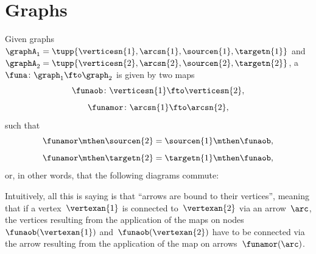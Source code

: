 

\section[Graphs]{Graphs}
\label{sec:cat-grph}


\begin{ctdefinition}
    \label{def:graph-homomorphism}
    Given graphs~${\graphA}_1=\tupp{\verticesn{1},\arcsn{1},\sourcen{1},\targetn{1}}$ and~${\graphA}_2=\tupp{\verticesn{2},\arcsn{2},\sourcen{2},\targetn{2}}$, a ~$\funa \colon \graph_1 \fto \graph_2$ is given by two maps~
    \begin{equation}
        \funaob\colon \verticesn{1} \fto \verticesn{2},
    \end{equation}
    \begin{equation}
        \funamor\colon \arcsn{1} \fto \arcsn{2},
    \end{equation}
    such that
    \begin{equation}
        \funamor \mthen \sourcen{2} = \sourcen{1}\mthen \funaob,
    \end{equation}
    \begin{equation}
        \funamor \mthen \targetn{2} = \targetn{1}\mthen \funaob,
    \end{equation}
    or, in other words, that the following diagrams commute:
    \begin{center}
    \end{center}
\end{ctdefinition}

\begin{remark}
    Intuitively, all this is saying is that ``arrows are bound to their vertices'', meaning that if a vertex~$\vertexan{1}$ is connected to~$\vertexan{2}$ via an arrow~$\arc$, the vertices resulting from the application of the maps on nodes~$\funaob(\vertexan{1})$ and~$\funaob(\vertexan{2})$ have to be connected via the arrow resulting from the application of the map on arrows~$\funamor(\arc)$.
\end{remark}

